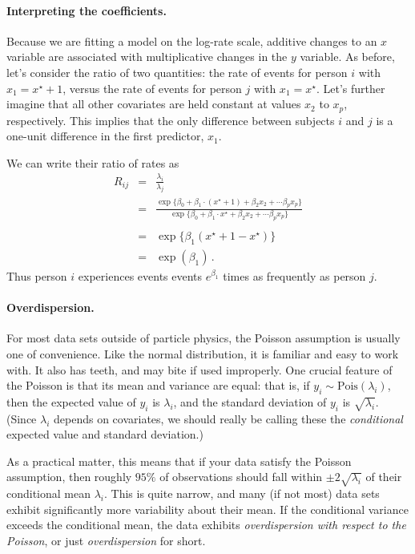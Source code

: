 \documentclass[11pt]{article}
\newcommand{\1}[1]{\mathbf{1}_{\{ {#1} \}}}
\begin{document}
\paragraph{Interpreting the coefficients.}
Because we are fitting a model on the log-rate scale, additive changes to an $x$ variable are associated with multiplicative changes in the $y$ variable.  As before, let's consider the ratio of two quantities: the rate of events for person $i$ with $x_1 = x^{\star} + 1$, versus the rate of events for person $j$ with $x_1 = x^{\star}$.  Let's further imagine that all other covariates are held constant at values $x_2$ to $x_p$, respectively.  This implies that the only difference between subjects $i$ and $j$ is a one-unit difference in the first predictor, $x_1$.

We can write their ratio of rates as
\begin{eqnarray*}
R_{ij} &=& \frac{\lambda_i}{\lambda_j} \\
&=& \frac{ \exp\{ \beta_0 + \beta_1 \cdot (x^{\star} + 1) + \beta_2 x_2 + \cdots \beta_p x_p \} } { \exp\{ \beta_0 + \beta_1 \cdot x^{\star} + \beta_2 x_2 + \cdots \beta_p x_p \} } \\
\\
&=& \exp\{ \beta_1 (x^{\star} + 1 - x^\star) \} \\
&=& \exp (\beta_1) \, .
\end{eqnarray*}
Thus person $i$ experiences events events $e^{\beta_1}$ times as frequently as person $j$.

\paragraph{Overdispersion.}  For most data sets outside of particle physics, the Poisson assumption is usually one of convenience.  Like the normal distribution, it is familiar and easy to work with.  It also has teeth, and may bite if used improperly.  One crucial feature of the Poisson is that its mean and variance are equal: that is, if $y_i \sim \mbox{Pois}(\lambda_i)$, then the expected value of $y_i$ is $\lambda_i$, and the standard deviation of $y_i$ is $\sqrt{\lambda_i}$.  (Since $\lambda_i$ depends on covariates, we should really be calling these the \textit{conditional} expected value and standard deviation.)

As a practical matter, this means that if your data satisfy the Poisson assumption, then roughly $95\%$ of observations should fall within $\pm 2 \sqrt{\lambda_i}$ of their conditional mean $\lambda_i$.  This is quite narrow, and many (if not most) data sets exhibit significantly more variability about their mean.  If the conditional variance exceeds the conditional mean, the data exhibits \textit{overdispersion with respect to the Poisson}, or just \textit{overdispersion} for short.
\end{document}

